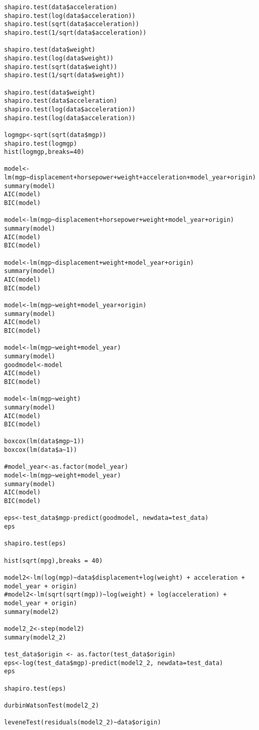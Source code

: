 \begin{lstlisting}
shapiro.test(data$acceleration)
shapiro.test(log(data$acceleration))
shapiro.test(sqrt(data$acceleration))
shapiro.test(1/sqrt(data$acceleration))

shapiro.test(data$weight)
shapiro.test(log(data$weight))
shapiro.test(sqrt(data$weight))
shapiro.test(1/sqrt(data$weight))

shapiro.test(data$weight)
shapiro.test(data$acceleration)
shapiro.test(log(data$acceleration))
shapiro.test(log(data$acceleration))

logmgp<-sqrt(sqrt(data$mgp))
shapiro.test(logmgp)
hist(logmgp,breaks=40)

model<-lm(mgp~displacement+horsepower+weight+acceleration+model_year+origin)
summary(model)
AIC(model)
BIC(model)

model<-lm(mgp~displacement+horsepower+weight+model_year+origin)
summary(model)
AIC(model)
BIC(model)

model<-lm(mgp~displacement+weight+model_year+origin)
summary(model)
AIC(model)
BIC(model)

model<-lm(mgp~weight+model_year+origin)
summary(model)
AIC(model)
BIC(model)

model<-lm(mgp~weight+model_year)
summary(model)
goodmodel<-model
AIC(model)
BIC(model)

model<-lm(mgp~weight)
summary(model)
AIC(model)
BIC(model)

boxcox(lm(data$mgp~1))
boxcox(lm(data$a~1))

#model_year<-as.factor(model_year)
model<-lm(mgp~weight+model_year)
summary(model)
AIC(model)
BIC(model)

eps<-test_data$mgp-predict(goodmodel, newdata=test_data)
eps

shapiro.test(eps)

hist(sqrt(mpg),breaks = 40)

model2<-lm(log(mgp)~data$displacement+log(weight) + acceleration + model_year + origin)
#model2<-lm(sqrt(sqrt(mgp))~log(weight) + log(acceleration) + model_year + origin)
summary(model2)

model2_2<-step(model2)
summary(model2_2)

test_data$origin <- as.factor(test_data$origin)
eps<-log(test_data$mgp)-predict(model2_2, newdata=test_data)
eps

shapiro.test(eps)

durbinWatsonTest(model2_2)

leveneTest(residuals(model2_2)~data$origin)
\end{lstlisting}

